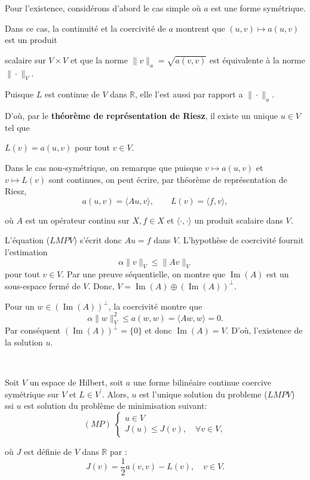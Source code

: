 Pour l'existence, considérons d'abord le cas simple où $a$ est une forme symétrique. 

Dans ce cas, la continuité et la coercivité de $a$ montrent que $(u,v)\longmapsto a(u,v)$ est un  produit 

scalaire sur $V \times V$ et que la norme $\|v\|_{a}=\sqrt{a(v, v)}$ est équivalente à la norme $\|\cdot\|_{V}$. 

Puisque $L$ est continue de $V$ dans $\mathbb{R}$, elle l'est aussi par rapport a $\|\cdot\|_{a}$. 

D'où,  par le {\bf théorème de représentation de Riesz}, il existe un unique $u \in V$ tel que 

$L(v)=a(u, v)$ pour tout $v \in V$.



Dans le cas non-symétrique, on remarque que puisque $v \mapsto a(u, v)$ et $v \mapsto L(v)$ sont continues, on peut écrire, par théorème de représentation de Riesz, 
$$
a(u, v)=\langle A u, v\rangle, \qquad L(v)=\langle f, v\rangle, 
$$ 

où $A$ est un opérateur continu sur $X, f \in X$ et $\langle\cdot, \cdot\rangle$ un produit scalaire dans $V$. 

L'équation ($LMPV$) s'écrit donc $A u=f$ dans $V$. L'hypothèse de coercivité fournit  l'estimation
$$
\alpha\|v\|_{V} \leq\|A v\|_{V}
$$
pour tout $v \in V$.  Par une preuve séquentielle,  on montre que $\operatorname{Im}(A)$ est un sous-espace fermé de $V$.  Donc,    $V=\operatorname{Im}(A) \oplus(\operatorname{Im}(A))^{\perp} .$ 

Pour un  $w \in(\operatorname{Im}(A))^{\perp}$,  la coercivité montre que
$$
\alpha\|w\|_{V}^{2} \leq a(w, w)=\langle A w, w\rangle=0.
$$
Par conséquent $(\operatorname{Im}(A))^{\perp}=\{0\} $ et donc $\operatorname{Im}(A)=V$. D'où, l'existence de la solution $u$.

\begin{proposition}\label{lax}\
	
Soit $V$ un espace de Hilbert, soit $a$ une forme bilinéaire continue coercive symétrique sur $V$ et $L \in V^{\prime}$. Alors, $u$ est l'unique  solution du probleme ($LMPV$) ssi $u$ est solution du problème de minimisation suivant:
$$
(MP)\;  \left\{\begin{array}{l}
	u \in V \\
	J(u) \leq J(v), \quad \forall v\in V,
\end{array}\right.
$$

où $J$ est définie de $V$ dans $\mathbb{R}$ par :
$$
J(v)=\frac{1}{2} a(v, v)-L(v),    \quad v\in V.
$$


\end{proposition}

